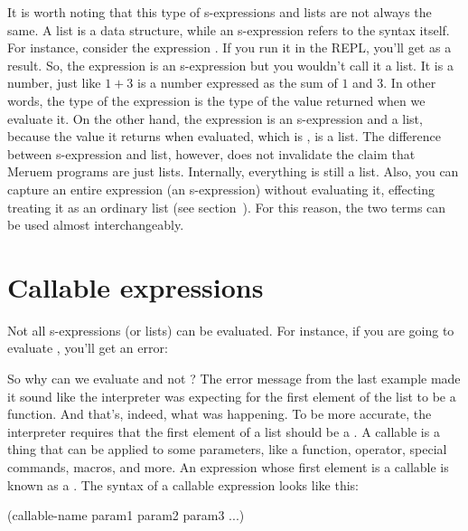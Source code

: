 It is worth noting that this type of s-expressions and lists are not always the same. A list is a data structure, while an s-expression refers to the syntax itself. For instance, consider the expression . If you run it in the REPL, you'll get  as a result. So, the expression  is an s-expression but you wouldn't call it a list. It is a number, just like $1 + 3$ is a number expressed as the sum of $1$ and $3$. In other words, the type of the expression is the type of the value returned when we evaluate it. On the other hand, the expression  is an s-expression and a list, because the value it returns when evaluated, which is , is a list. The difference between s-expression and list, however, does not invalidate the claim that Meruem programs are just lists. Internally, everything is still a list. Also, you can capture an entire expression (an s-expression) without evaluating it, effecting treating it as an ordinary list (see section~). For this reason, the two terms can be used almost interchangeably.

\section{Callable expressions}
Not all s-expressions (or lists) can be evaluated. For instance, if you are going to evaluate , you'll get an error:

\begin{REPL}
meruem> (1 2 3)
An error has occurred. 1 can not be converted to a function.
Source: .home.melvic.meruem.meruem.prelude [1:2}]
(1 2 3)
 ^
\end{REPL}

So why can we evaluate  and not ? The error message from the last example made it sound like the interpreter was expecting for the first element of the list to be a function. And that's, indeed, what was happening. To be more accurate, the interpreter requires that the first element of a list should be a . A callable is a thing that can be applied to some parameters, like a function, operator, special commands, macros, and more. An expression whose first element is a callable is known as a . The syntax of a callable expression looks like this:

\begin{QuasiLang}
(callable-name param1 param2 param3 ...)
\end{QuasiLang}


